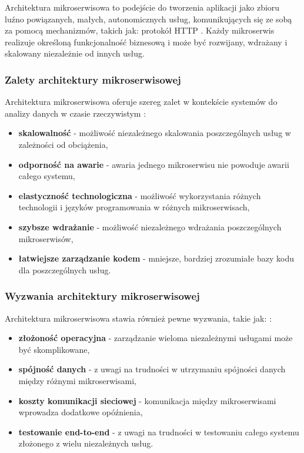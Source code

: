 Architektura mikroserwisowa to podejście do tworzenia aplikacji jako zbioru luźno powiązanych, małych, autonomicznych usług,
komunikujących się ze sobą za pomocą mechanizmów, takich jak: protokół HTTP \cite{microservice_architecture}.
Każdy mikroserwis realizuje określoną funkcjonalność biznesową i może być rozwijany, wdrażany i skalowany niezależnie od innych usług.

\subsubsection{Zalety architektury mikroserwisowej}
\label{subsubsec:zalety_mikroserwisow}

Architektura mikroserwisowa oferuje szereg zalet w kontekście systemów do analizy danych w czasie rzeczywistym \cite{microservice_benefits}:

\begin{itemize}
    \item \textbf{skalowalność} - możliwość niezależnego skalowania poszczególnych usług w zależności od obciążenia,
    \item \textbf{odporność na awarie} - awaria jednego mikroserwisu nie powoduje awarii całego systemu,
    \item \textbf{elastyczność technologiczna} - możliwość wykorzystania różnych technologii i języków programowania w różnych mikroserwisach,
    \item \textbf{szybsze wdrażanie} - możliwość niezależnego wdrażania poszczególnych mikroserwisów,
    \item \textbf{łatwiejsze zarządzanie kodem} - mniejsze, bardziej zrozumiałe bazy kodu dla poszczególnych usług.
\end{itemize}

\subsubsection{Wyzwania architektury mikroserwisowej}
\label{subsubsec:wyzwania_mikroserwisow}

Architektura mikroserwisowa stawia również pewne wyzwania, takie jak: \cite{microservice_challenges}:

\begin{itemize}
    \item \textbf{złożoność operacyjna} - zarządzanie wieloma niezależnymi usługami może być skomplikowane,
    \item \textbf{spójność danych} - z uwagi na trudności w utrzymaniu spójności danych między różnymi mikroserwisami,
    \item \textbf{koszty komunikacji sieciowej} - komunikacja między mikroserwisami wprowadza dodatkowe opóźnienia,
    \item \textbf{testowanie end-to-end} - z uwagi na trudności w testowaniu całego systemu złożonego z wielu niezależnych usług.
\end{itemize}

